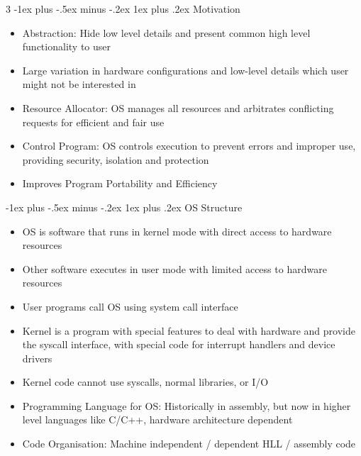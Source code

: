 \documentclass[10pt, landscape]{article}
\makeatletter
\renewcommand{\subsection}{\@startsection{subsection}{3}{0mm}%
                                {-1ex plus -.5ex minus -.2ex}%
                                {1ex plus .2ex}%
                                {\normalfont\small\bfseries}}%
\makeatother
\begin{document}
\begin{multicols*}{3}
\subsection{Motivation}
\begin{itemize}
    \item Abstraction: Hide low level details and present common high level functionality to user
    \item Large variation in hardware configurations and low-level details which user might not be interested in
    \item Resource Allocator: OS manages all resources and arbitrates conflicting requests for efficient and fair use
    \item Control Program: OS controls execution to prevent errors and improper use, providing security, isolation and protection
    \item Improves Program Portability and Efficiency
\end{itemize}

\subsection{OS Structure}
\begin{itemize}
    \item OS is software that runs in kernel mode with direct access to hardware resources
    \item Other software executes in user mode with limited access to hardware resources
    \item User programs call OS using system call interface
    \item Kernel is a program with special features to deal with hardware and provide the syscall interface, with special code for interrupt handlers and device drivers
    \item Kernel code cannot use syscalls, normal libraries, or I/O
    \item Programming Language for OS: Historically in assembly, but now in higher level languages like C/C++, hardware architecture dependent
    \item Code Organisation: Machine independent / dependent HLL / assembly code
\end{itemize}


\end{multicols*}
\end{document}
